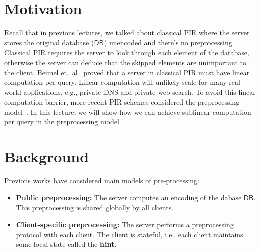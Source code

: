 



\section{Motivation}
Recall that in previous lectures, we talked about classical PIR where the server stores the original database ($\mathsf{DB}$) unencoded and there's no preprocessing. Classical PIR requires the server to look through each element of the database, otherwise the server can deduce that the skipped elements are unimportant to the client. Beimel et.~al~\cite{beimel2000reducing} proved that a server in classical PIR must have linear computation per query.
Linear computation will unlikely 
scale for many real-world applications, e.g., private DNS and private 
web search. 
To avoid this linear computation barrier,  
more recent PIR schemes 
considered 
the preprocessing model~\cite{beimel2000reducing,sublinearpir}. 
In this lecture, we will show how we can achieve sublinear computation
per query in the preprocessing model. 

\section{Background}
Previous works have considered 
main models of pre-processing: 

    \begin{itemize}
        \item \textbf{Public preprocessing:} The server computes an encoding of the dabase 
$\mathsf{DB}$. This preprocessing is shared
globally by all clients. %
        \item \textbf{Client-specific preprocessing:} 
The server performs a preprocessing protocol with each client. The client is stateful, i.e., each client maintains some local state called the \textbf{hint}.
    \end{itemize}

